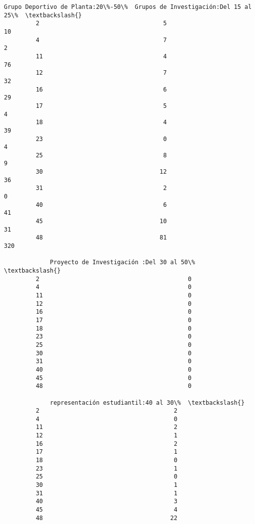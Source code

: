 \documentclass[11pt]{article}
\begin{document}
\begin{Verbatim}[commandchars=\\\{\}]
             Grupo Deportivo de Planta:20\%-50\%  Grupos de Investigación:Del 15 al 25\%  \textbackslash{}
         2                                   5                                     10   
         4                                   7                                      2   
         11                                  4                                     76   
         12                                  7                                     32   
         16                                  6                                     29   
         17                                  5                                      4   
         18                                  4                                     39   
         23                                  0                                      4   
         25                                  8                                      9   
         30                                 12                                     36   
         31                                  2                                      0   
         40                                  6                                     41   
         45                                 10                                     31   
         48                                 81                                    320   
         
             Proyecto de Investigación :Del 30 al 50\%  \textbackslash{}
         2                                          0   
         4                                          0   
         11                                         0   
         12                                         0   
         16                                         0   
         17                                         0   
         18                                         0   
         23                                         0   
         25                                         0   
         30                                         0   
         31                                         0   
         40                                         0   
         45                                         0   
         48                                         0   
         
             representación estudiantil:40 al 30\%  \textbackslash{}
         2                                      2   
         4                                      0   
         11                                     2   
         12                                     1   
         16                                     2   
         17                                     1   
         18                                     0   
         23                                     1   
         25                                     0   
         30                                     1   
         31                                     1   
         40                                     3   
         45                                     4   
         48                                    22   
         

\end{Verbatim}
\end{document}
